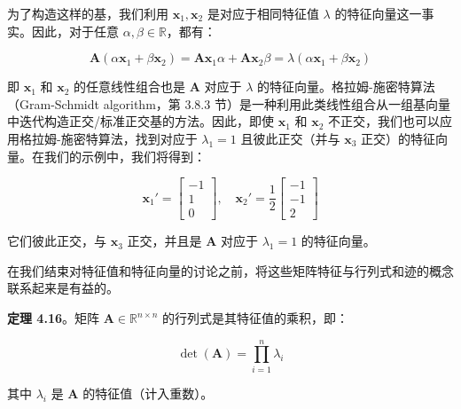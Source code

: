 \begin{notebox}
为了构造这样的基，我们利用 $ \boldsymbol{x}_1, \boldsymbol{x}_2 $ 是对应于相同特征值 $ \lambda $ 的特征向量这一事实。因此，对于任意 $ \alpha, \beta \in \mathbb{R} $，都有：

\begin{equation}
\boldsymbol{A}(\alpha \boldsymbol{x}_1 + \beta \boldsymbol{x}_2) = \boldsymbol{A} \boldsymbol{x}_1 \alpha + \boldsymbol{A} \boldsymbol{x}_2 \beta = \lambda(\alpha \boldsymbol{x}_1 + \beta \boldsymbol{x}_2)
\tag{4.40}\label{eq:4-40}
\end{equation}

即 $ \boldsymbol{x}_1 $ 和 $ \boldsymbol{x}_2 $ 的任意线性组合也是 $ \boldsymbol{A} $ 对应于 $ \lambda $ 的特征向量。格拉姆-施密特算法（Gram-Schmidt algorithm，第 3.8.3 节）是一种利用此类线性组合从一组基向量中迭代构造正交/标准正交基的方法。因此，即使 $ \boldsymbol{x}_1 $ 和 $ \boldsymbol{x}_2 $ 不正交，我们也可以应用格拉姆-施密特算法，找到对应于 $ \lambda_1 = 1 $ 且彼此正交（并与 $ \boldsymbol{x}_3 $ 正交）的特征向量。在我们的示例中，我们将得到：

\begin{equation}
\boldsymbol{x}_1' = \begin{bmatrix} -1 \\ 1 \\ 0 \end{bmatrix}, \quad \boldsymbol{x}_2' = \frac{1}{2} \begin{bmatrix} -1 \\ -1 \\ 2 \end{bmatrix}
\tag{4.41}\label{eq:4-41}
\end{equation}

它们彼此正交，与 $ \boldsymbol{x}_3 $ 正交，并且是 $ \boldsymbol{A} $ 对应于 $ \lambda_1 = 1 $ 的特征向量。
\end{notebox}

在我们结束对特征值和特征向量的讨论之前，将这些矩阵特征与行列式和迹的概念联系起来是有益的。

\textbf{定理 4.16}。矩阵 $ \boldsymbol{A} \in \mathbb{R}^{n \times n} $ 的行列式是其特征值的乘积，即：

\begin{equation}
\det(\boldsymbol{A}) = \prod_{i=1}^n \lambda_i
\tag{4.42}\label{eq:4-42}
\end{equation}

其中 $ \lambda_i $ 是 $ \boldsymbol{A} $ 的特征值（计入重数）。

